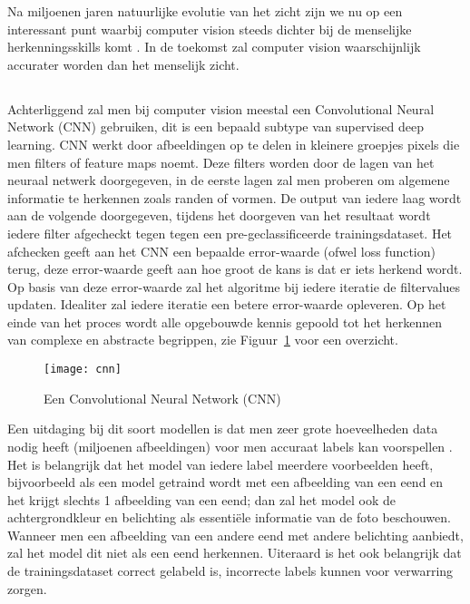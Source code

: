 Na miljoenen jaren natuurlijke evolutie van het zicht zijn we nu op een interessant punt waarbij computer vision steeds dichter bij de menselijke herkenningsskills komt \autocite{Scheirer2014}. In de toekomst zal computer vision waarschijnlijk accurater worden dan het menselijk zicht.

\subsection{}
\label{sec:convolutional-neural-network}
Achterliggend zal men bij computer vision meestal een Convolutional Neural Network (CNN) gebruiken, dit is een bepaald subtype van supervised deep learning. CNN werkt door afbeeldingen op te delen in kleinere groepjes pixels die men filters of feature maps noemt. Deze filters worden door de lagen van het neuraal netwerk doorgegeven, in de eerste lagen zal men proberen om algemene informatie te herkennen zoals randen of vormen. De output van iedere laag wordt aan de volgende doorgegeven, tijdens het doorgeven van het resultaat wordt iedere filter afgecheckt tegen tegen een pre-geclassificeerde trainingsdataset. Het afchecken geeft aan het CNN een bepaalde error-waarde (ofwel loss function) terug, deze error-waarde geeft aan hoe groot de kans is dat er iets herkend wordt. Op basis van deze error-waarde zal het algoritme bij iedere iteratie de filtervalues updaten. Idealiter zal iedere iteratie een betere error-waarde opleveren. Op het einde van het proces wordt alle opgebouwde kennis gepoold tot het herkennen van complexe en abstracte begrippen, zie Figuur~\ref{fig:cnn} voor een overzicht.

\begin{figure}
    \centering
    \texttt{[image: cnn]}
    \caption{Een Convolutional Neural Network (CNN) \autocite{Sunit2018}}
    \label{fig:cnn}
\end{figure}

Een uitdaging bij dit soort modellen is dat men zeer grote hoeveelheden data nodig heeft (miljoenen afbeeldingen) voor men accuraat labels kan voorspellen \autocite{Chen2014}. Het is belangrijk dat het model van iedere label meerdere voorbeelden heeft, bijvoorbeeld als een model getraind wordt met een afbeelding van een eend en het krijgt slechts 1 afbeelding van een eend; dan zal het model ook de achtergrondkleur en belichting als essentiële informatie van de foto beschouwen. Wanneer men een afbeelding van een andere eend met andere belichting aanbiedt, zal het model dit niet als een eend herkennen. Uiteraard is het ook belangrijk dat de trainingsdataset correct gelabeld is, incorrecte labels kunnen voor verwarring zorgen.

